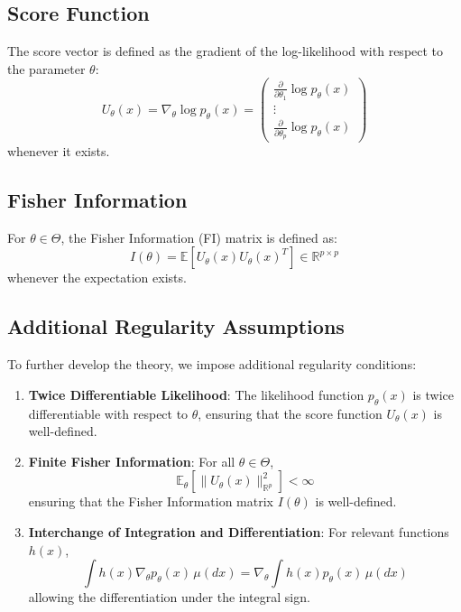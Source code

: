 \documentclass[open=any, 11pt,paper=A4]{scrreprt}
\begin{document}
\subsection{Score Function}

\begin{definition}[Score]
The score vector is defined as the gradient of the log-likelihood with respect to the parameter $\theta$:
\[
U_{\theta}(x) = \nabla_\theta \log p_\theta(x) = \begin{pmatrix}
    \frac{\partial}{\partial \theta_1} \log p_\theta(x) \\
    \vdots \\
    \frac{\partial}{\partial \theta_p} \log p_\theta(x)
\end{pmatrix}
\]
whenever it exists.
\end{definition}

\subsection{Fisher Information}

\begin{definition}
For $\theta \in \Theta$, the Fisher Information (FI) matrix is defined as:
\[
I(\theta) = \mathbb{E}\left[ U_\theta(x) U_\theta(x)^T \right] \in \mathbb{R}^{p \times p}
\]
whenever the expectation exists.
\end{definition}

\subsection{Additional Regularity Assumptions}

To further develop the theory, we impose additional regularity conditions:

\begin{enumerate}
    \item \textbf{Twice Differentiable Likelihood}: The likelihood function $p_\theta(x)$ is twice differentiable with respect to $\theta$, ensuring that the score function $U_\theta(x)$ is well-defined.
    
    \item \textbf{Finite Fisher Information}: For all $\theta \in \Theta$,
    \[
    \mathbb{E}_\theta \left[ \| U_\theta(x) \|^2_{\mathbb{R}^p} \right] < \infty
    \]
    ensuring that the Fisher Information matrix $I(\theta)$ is well-defined.
    
    \item \textbf{Interchange of Integration and Differentiation}: For relevant functions $h(x)$,
    \[
    \int h(x) \nabla_\theta p_\theta(x) \, \mu(dx) = \nabla_\theta \int h(x) p_\theta(x) \, \mu(dx)
    \]
    allowing the differentiation under the integral sign.
\end{enumerate}
\end{document}
